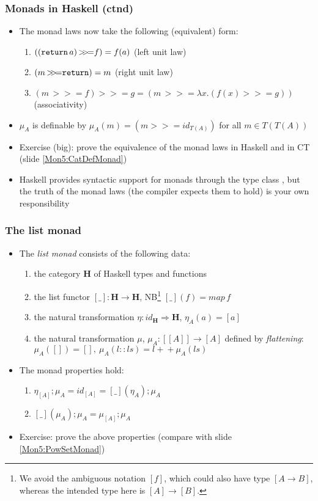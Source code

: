 \documentclass[handout]{beamer}
\newcommand{\To}{\Rightarrow}
\newcommand{\bfsf}[1]{{\boldsymbol{#1}}}
\newcommand{\HH}{\bfsf{H}}
\newcommand{\bind}{{>}\!\!{>}\!{=}}
\newcommand{\ttt}[1]{\text{\tt #1}}
\begin{document}
\frame
  {   
    \frametitle{Monads in Haskell (ctnd)}\label{Mon5:MonadHaskCtnd}

 \begin{itemize}[<+->]
\item The monad laws now take the following (equivalent) form:
\begin{enumerate}
    \item $((\ttt{return}\,a)\, \bind f) = f(a)$ (left unit law)
    \item $(m\, \bind \ttt{return}) = m$ (right unit law)
    \item $(m\, \bind f) \bind g = (m\, \bind \lambda x. (f(x) \bind g))$ (associativity)
 \end{enumerate}
\item $\mu_A$ is definable by $\mu_A(m) = (m\bind id_{T(A)})$ for all $m\in T(T(A))$
\item Exercise (big): prove the equivalence of the monad laws in Haskell 
and in CT (slide \ref{Mon5:CatDefMonad})
\item Haskell provides syntactic support for monads through the type class
\href{https://wiki.haskell.org/All_About_Monads}%
{\color{blue}\ttt{Monad}}, but the truth of the monad laws (the compiler expects them to hold)
is your own responsibility
 \end{itemize}

 }


\frame
  {   
    \frametitle{The list monad}\label{Mon5:ListMonad}

 \begin{itemize}[<+->]
\item The \emph{list monad} consists of the following data:
 \begin{enumerate}
    \item the category $\HH$ of Haskell types and functions
    \item the list functor $[\_]:\HH\to\HH$, NB\footnote%
{We avoid the ambiguous notation $[f]$, which could also have type $[A\to B]$,
whereas the intended type here is $[A]\to [B]$.}
 $[\_](f)  =  map\, f$
    \item the natural transformation $\eta: id_\HH \To \HH$, $\eta_A(a)= [a]$
    \item the natural transformation $\mu$, 
$\mu_A: [[A]] \to [A] $ defined by \emph{flattening}:
$\mu_A([]) = [],~\mu_A(l::ls) = l{+}\!{+}\mu_A(ls)$
 \end{enumerate}
\item The monad properties hold:
 \begin{enumerate}
    \item $\eta_{[A]};\mu_A = id_{[A]} = [\_](\eta_A);\mu_A$
    \item $[\_](\mu_A);\mu_A = \mu_{[A]};\mu_A$
 \end{enumerate}
\item Exercise: prove the above properties (compare with slide \ref{Mon5:PowSetMonad})
 \end{itemize}

 }
\end{document}
